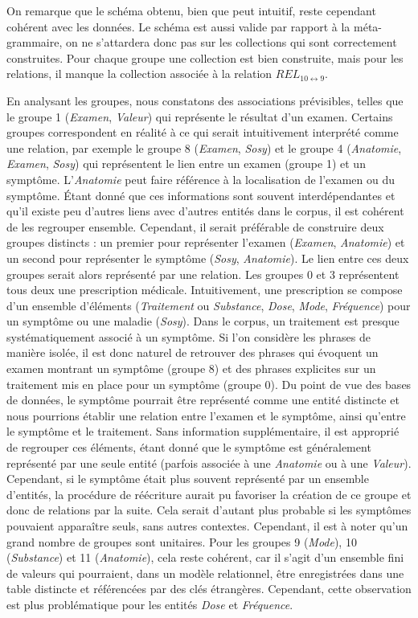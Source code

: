 On remarque que le schéma obtenu, bien que peut intuitif, reste cependant cohérent avec les données.
Le schéma est aussi valide par rapport à la méta-grammaire, on ne s'attardera donc pas sur les collections qui sont correctement construites.
Pour chaque groupe une collection est bien construite, mais pour les relations, il manque la collection associée à la relation $REL_{10 \leftrightarrow 9}$.

En analysant les groupes, nous constatons des associations prévisibles, telles que le groupe 1 (\emph{Examen}, \emph{Valeur}) qui représente le résultat d'un examen.
Certains groupes correspondent en réalité à ce qui serait intuitivement interprété comme une relation, par exemple le groupe 8 (\emph{Examen}, \emph{Sosy}) et le groupe 4 (\emph{Anatomie}, \emph{Examen}, \emph{Sosy}) qui représentent le lien entre un examen (groupe 1) et un symptôme.
L'\emph{Anatomie} peut faire référence à la localisation de l'examen ou du symptôme.
Étant donné que ces informations sont souvent interdépendantes et qu'il existe peu d'autres liens avec d'autres entités dans le corpus, il est cohérent de les regrouper ensemble.
Cependant, il serait préférable de construire deux groupes distincts : un premier pour représenter l'examen (\emph{Examen}, \emph{Anatomie}) et un second pour représenter le symptôme (\emph{Sosy}, \emph{Anatomie}).
Le lien entre ces deux groupes serait alors représenté par une relation.
Les groupes 0 et 3 représentent tous deux une prescription médicale.
Intuitivement, une prescription se compose d'un ensemble d'éléments (\emph{Traitement} ou \emph{Substance}, \emph{Dose}, \emph{Mode}, \emph{Fréquence}) pour un symptôme ou une maladie (\emph{Sosy}).
Dans le corpus, un traitement est presque systématiquement associé à un symptôme.
Si l'on considère les phrases de manière isolée, il est donc naturel de retrouver des phrases qui évoquent un examen montrant un symptôme (groupe 8) et des phrases explicites sur un traitement mis en place pour un symptôme (groupe 0).
Du point de vue des bases de données, le symptôme pourrait être représenté comme une entité distincte et nous pourrions établir une relation entre l'examen et le symptôme, ainsi qu'entre le symptôme et le traitement.
Sans information supplémentaire, il est approprié de regrouper ces éléments, étant donné que le symptôme est généralement représenté par une seule entité (parfois associée à une \emph{Anatomie} ou à une \emph{Valeur}).
Cependant, si le symptôme était plus souvent représenté par un ensemble d'entités, la procédure de réécriture aurait pu favoriser la création de ce groupe et donc de relations par la suite.
Cela serait d'autant plus probable si les symptômes pouvaient apparaître seuls, sans autres contextes.
Cependant, il est à noter qu'un grand nombre de groupes sont unitaires.
Pour les groupes 9 (\emph{Mode}), 10 (\emph{Substance}) et 11 (\emph{Anatomie}), cela reste cohérent, car il s'agit d'un ensemble fini de valeurs qui pourraient, dans un modèle relationnel, être enregistrées dans une table distincte et référencées par des clés étrangères.
Cependant, cette observation est plus problématique pour les entités \emph{Dose} et \emph{Fréquence}.

